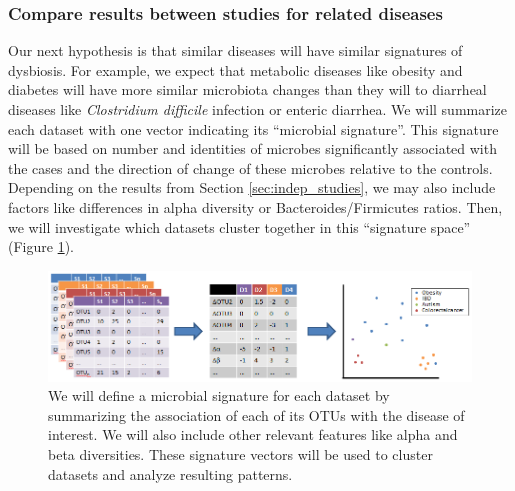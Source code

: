 \documentclass[12pt]{article}
\begin{document}
\subsubsection{Compare results between studies for related diseases}\label{sec:signatures}
Our next hypothesis is that similar diseases will have similar 
signatures of dysbiosis. For example, we expect that metabolic 
diseases like obesity and diabetes will have more similar microbiota 
changes than they will to diarrheal diseases like \textit{Clostridium 
difficile} infection or enteric diarrhea. We will summarize each 
dataset with one vector indicating its ``microbial signature''. This 
signature will be based on number and identities of microbes 
significantly associated with the cases and the direction of change 
of these microbes relative to the controls. Depending on the results from Section 
\ref{sec:indep_studies}, we may also include factors like differences 
in alpha diversity or Bacteroides/Firmicutes ratios. Then, we will 
investigate which datasets cluster together in this ``signature space'' 
(Figure \ref{fig:microbe_signatures}).

\begin{figure}
\begin{center}
\includegraphics[scale=0.6]{microbial_signatures}
\caption{We will define a microbial signature for each dataset by summarizing
the association of each of its OTUs with the disease of interest. We will
also include other relevant features like alpha and beta diversities. These 
signature vectors will be used to cluster datasets and analyze resulting patterns.}\label{fig:microbe_signatures}
\end{center}
\end{figure}
\end{document}
